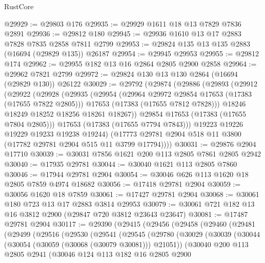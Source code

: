 \begin{lexlean}{RustCore}
\begin{coremodule}
@29929 := @29803 @176
@29935 := @29929 @1611 @18 @13 @7829 @7836 @2891
@29936 := @29812 @180
@29945 := @29936 @1610 @13 @17 @2883 @7828 @7835 @2858 @7811 @2799
@29953 := @29824 @135 @13 @135 @2883 (@16694 (@29829 @135)) @26187
@29954 := @29945 @29953
@29955 := @29812 @174
@29962 := @29955 @182 @13 @16 @2864 @2805 @2900 @2858
@29964 := @29962 @7821 @2799
@29972 := @29824 @130 @13 @130 @2864 (@16694 (@29829 @130)) @26122
@30029 := @29792
    (@29874
      (@29886
        (@29893
          (@29912
            (@29922
              (@29928
                (@29935
                  (@29954
                    (@29964 @29972 @29854 @17653 (@17383 (@17655 @7822 @2805)))
                    @17653
                    (@17383 (@17655 @7812 @7828)))
                  @18246
                  @18249
                  @18252
                  @18256
                  @18261
                  @18267))
              @29854
              @17653
              (@17383 (@17655 @7804 @2805)))
            @17653
            (@17383 (@17655 @7794 @7843)))
          @19223
          @19226
          @19229
          @19233
          @19238
          @19244)
        (@17773 @29781 @2904 @518 @11 @3800 (@17782 @29781 @2904 @515 @11 @3799 @17794))))
@30031 := @29876 @2904 @17710
@30039 := @30031 @7856 @1621 @200 @113 @2805 @7861 @2805 @2942
@30040 := @17935 @29781
@30044 := @30040 @1621 @113 @2805 @7860
@30046 := @17944 @29781 @2904
@30054 := @30046 @626 @113 @1620 @18 @2805 @7859 @4974 @18682
@30056 := @17418 @29781 @2904
@30059 := @30056 @1620 @18 @7859
@30061 := @17427 @29781 @2904
@30068 := @30061 @180 @723 @13 @17 @2883 @3814 @29953
@30079 := @30061 @721 @182 @13 @16 @3812 @2900 (@29847 @720 @3812 @23643 @23647)
@30081 := @17487 @29781 @2904
@30117 := @29390
    (@29415
      (@29456
        (@29458
          (@29460
            (@29481
              (@29499
                (@29516
                  (@29530
                    (@29541
                      (@29545
                        (@29780
                          (@30029
                            (@30039
                              (@30044 (@30054 (@30059 (@30068 (@30079 @30081))) @21051))
                              (@30040
                                @200
                                @113
                                @2805
                                @2941
                                (@30046
                                  @124
                                  @113
                                  @182
                                  @16
                                  @2805
                                  @2900

\end{coremodule}
\end{lexlean}
